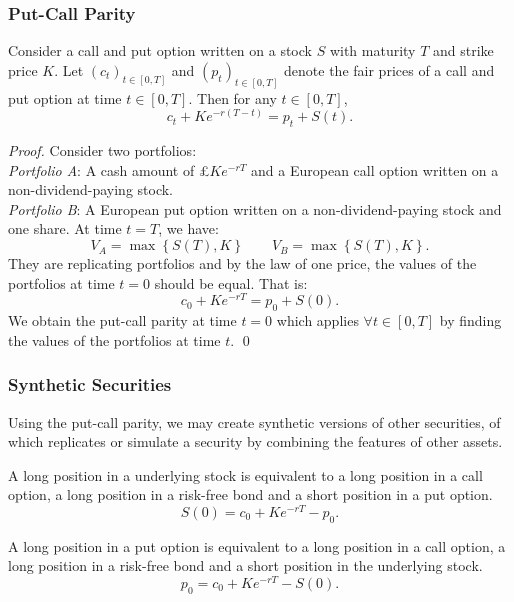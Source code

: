 \subsubsection{Put-Call Parity}
\begin{theorem}
  Consider a call and put option written on a stock $S$ with maturity $T$ and
  strike price $K$. Let ${\left( c_t \right)}_{t\in \left[ 0,T \right]}$ and
  ${\left( p_t \right)}_{t\in \left[ 0,T \right]}$ denote the fair prices of a
  call and put option at time  $t\in \left[ 0,T \right]$. Then for any $t\in \left[ 0,T \right]$,
  \[c_{t}+Ke^{-r(T-t)}=p_{t}+S(t).\] 
\end{theorem}
\begin{proof}
  Consider two portfolios:\\
  \textit{Portfolio A}: A cash amount of £$Ke^{-rT}$ and a European call option
  written on a non-dividend-paying stock.\\
  \textit{Portfolio B}: A European put option written on a non-dividend-paying
  stock and one share.
  At time $t=T$, we have:
  \[V_A=\max \left\{ S(T),K \right\}\qquad V_B=\max \left\{ S(T),K \right\}.\]
  They are replicating portfolios and by the law of one price, the values
  of the portfolios at time $t=0$ should be equal. That is:
  \[c_{0}+Ke^{-rT}=p_{0}+S(0).\]
  We obtain the put-call parity at time $t=0$ which applies $\forall t\in [0,T]$ by finding the
  values of the portfolios at time $t$.
  \qed%
\end{proof}

\subsubsection{Synthetic Securities}
Using the put-call parity, we may create synthetic versions of other
securities, of which replicates or simulate a security by combining the
features of other assets.
\begin{example}
  A long position in a underlying stock is equivalent to a long position in a
  call option, a long position in a risk-free bond and a short position in a
  put option.
  \[S(0)=c_0+Ke^{-rT}-p_0.\] 
\end{example}
\begin{example}
  A long position in a put option is equivalent to a long position in a call
  option, a long position in a risk-free bond and a short position in the
  underlying stock.
  \[p_0=c_0+Ke^{-rT}-S(0).\] 
\end{example}

